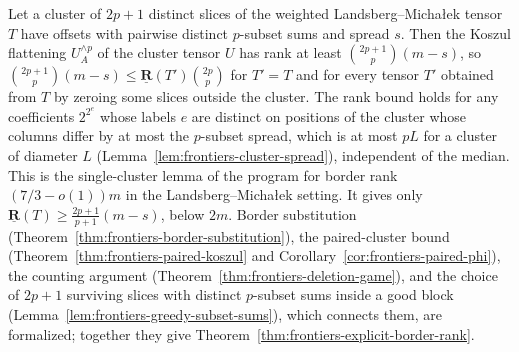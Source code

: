 \begin{theorem}
  \label{thm:frontiers-cluster-koszul}
  \leanok
  Let a cluster of $2p + 1$ distinct slices of the weighted Landsberg--Micha{\l}ek tensor
  $T$ have offsets with pairwise distinct $p$-subset sums and spread $s$. Then the Koszul
  flattening $U_A^{\wedge p}$ of the cluster tensor $U$ has rank at least
  $\binom{2p+1}{p} (m - s)$, so
  $\binom{2p+1}{p} (m - s) \le \underline{\mathbf{R}}(T') \binom{2p}{p}$ for $T' = T$ and
  for every tensor $T'$ obtained from $T$ by zeroing some slices outside the cluster. The rank
  bound holds for any coefficients $2^{2^{e}}$ whose labels $e$ are distinct on positions
  of the cluster whose columns differ by at most the $p$-subset spread, which is at most $pL$
  for a cluster of diameter $L$ (Lemma~\ref{lem:frontiers-cluster-spread}), independent of
  the median. This is the single-cluster lemma of the
  program for border rank $(7/3 - o(1)) m$ in the Landsberg--Micha{\l}ek setting. It gives
  only $\underline{\mathbf{R}}(T) \ge \frac{2p+1}{p+1} (m - s)$, below $2m$. Border
  substitution (Theorem~\ref{thm:frontiers-border-substitution}), the paired-cluster bound
  (Theorem~\ref{thm:frontiers-paired-koszul} and Corollary~\ref{cor:frontiers-paired-phi}),
  the counting argument (Theorem~\ref{thm:frontiers-deletion-game}), and the choice of
  $2p + 1$ surviving slices with distinct $p$-subset sums inside a good block
  (Lemma~\ref{lem:frontiers-greedy-subset-sums}), which connects them, are formalized; together
  they give Theorem~\ref{thm:frontiers-explicit-border-rank}.
\end{theorem}
